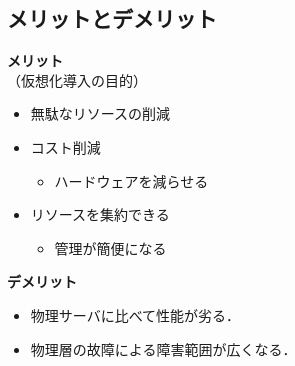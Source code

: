 \subsection{メリットとデメリット}
\begin{frame}[t]{\ftitle}
    \begin{minipage}[t]{.49\textwidth}
        \textbf{\cmark メリット}\\\hspace{1\zw}（仮想化導入の目的）
        \begin{itemize}
            \setlength{\itemsep}{1em}
            \item 無駄なリソースの削減
            \item コスト削減
                  \begin{itemize}
                      \item[\faArrowCircleORight] ハードウェアを減らせる
                  \end{itemize}
            \item リソースを集約できる
                  \begin{itemize}
                      \item[\faArrowCircleORight] 管理が簡便になる
                  \end{itemize}
        \end{itemize}
    \end{minipage}
    \begin{minipage}[t]{.49\textwidth}
        \textbf{\xmark デメリット}\\
        \begin{itemize}
            \setlength{\itemsep}{1em}
            \item 物理サーバに比べて性能が劣る．
            \item 物理層の故障による障害範囲が広くなる．
        \end{itemize}
    \end{minipage}
\end{frame}